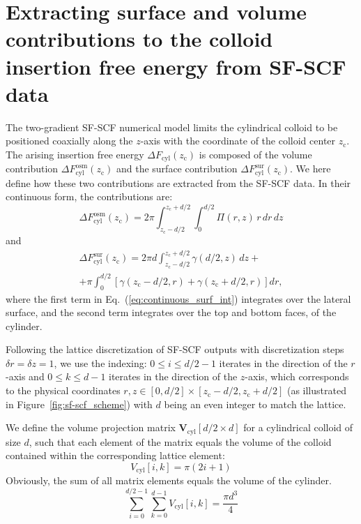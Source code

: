 \documentclass[10pt, a4paper, twocolumn]{article}
\begin{document}
\section{Extracting surface and volume contributions to the colloid insertion free energy from SF-SCF data}



The two-gradient SF-SCF numerical model limits the cylindrical colloid to be positioned coaxially along the $z$-axis with the coordinate of the colloid center $z_{\text{c}}$.
The arising insertion free energy $\Delta F_{\text{cyl}}(z_{\text{c}})$ is composed of the volume contribution $\Delta F_{\text{cyl}}^{\text{osm}}(z_{\text{c}})$ and the surface contribution $\Delta F_{\text{cyl}}^{\text{sur}}(z_{\text{c}})$.
We here define how these two contributions are extracted from the SF-SCF data.
In their continuous form, the contributions are:
\begin{equation}
    \Delta F_{\text{cyl}}^{\text{osm}}(z_{\text{c}}) = 2 \pi \int_{z_{\text{c}} - d/2}^{z_{\text{c}} + d/2} \int_{0}^{d/2} \Pi(r,z) \, r \, dr \, dz
\end{equation}
and
\begin{equation}\label{eq:continuous_surf_int}
    \begin{aligned}
        \Delta F_{\text{cyl}}^{\text{sur}}(z_{\text{c}}) = 2 \pi d \int_{z_{\text{c}} - d/2}^{z_{\text{c}} + d/2} \gamma(d/2,z) \, dz +\\
        + \pi \int_{0}^{d/2} \left[ \gamma(z_{\text{c}} - d/2, r) + \gamma(z_{\text{c}} + d/2,r) \right] dr,
    \end{aligned}
\end{equation}
where the first term in Eq.~(\ref{eq:continuous_surf_int}) integrates over the lateral surface, and the second term integrates over the top and bottom faces, of the cylinder.

Following the lattice discretization of SF-SCF outputs with discretization steps $\delta r = \delta z = 1$, we use the indexing: $0 \le i \le d/2-1$ iterates in the direction of the $r$-axis and $0 \le k \le d-1$ iterates in the direction of the $z$-axis, which corresponds to the physical coordinates $r,z \in [0, d/2]\times[z_{\text{c}} - d/2, z_{\text{c}} + d/2]$ (as illustrated in Figure~\ref{fig:sf-scf_scheme}) with $d$ being an even integer to match the lattice.

We define the volume projection matrix $\bm{V}_{\text{cyl}}[d/2 \times d]$ for a cylindrical colloid of size $d$, such that each element of the matrix equals the volume of the colloid contained within the corresponding lattice element:
\begin{equation}
    V_{\text{cyl}}[i, k] = \pi(2i + 1)
\end{equation}
Obviously, the sum of all matrix elements equals the volume of the cylinder.
\begin{equation*}
    \sum_{i=0}^{d/2 - 1} \sum_{k=0}^{d - 1} V_{\text{cyl}}[i, k] = \frac{\pi d^3}{4}
\end{equation*}
\end{document}
